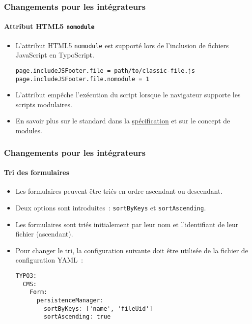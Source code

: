 
\begin{frame}[fragile]
	\frametitle{Changements pour les intégrateurs}
	\framesubtitle{Attribut HTML5 \texttt{nomodule}}

	\lstset{basicstyle=\tiny\ttfamily}

	\begin{itemize}
		\item L'attribut HTML5 \texttt{nomodule} est supporté lors de l'inclusion de fichiers JavaScript en TypoScript.
\begin{lstlisting}
page.includeJSFooter.file = path/to/classic-file.js
page.includeJSFooter.file.nomodule = 1
\end{lstlisting}

		\item L'attribut empêche l'exécution du script lorsque le navigateur supporte les scripts modulaires.

		\item En savoir plus sur le standard dans la
			\href{https://html.spec.whatwg.org/multipage/scripting.html#attr-script-nomodule}{spécification}
			et sur le concept de
			\href{https://hacks.mozilla.org/2015/08/es6-in-depth-modules/}{modules}.

	\end{itemize}


\end{frame}


\begin{frame}[fragile]
	\frametitle{Changements pour les intégrateurs}
	\framesubtitle{Tri des formulaires}

	\lstset{basicstyle=\tiny\ttfamily}

	\begin{itemize}
		\item Les formulaires peuvent être triés en ordre ascendant ou descendant.
		\item Deux options sont introduites~: \texttt{sortByKeys} et \texttt{sortAscending}.
		\item Les formulaires sont triés initialement par leur nom et l'identifiant de leur fichier (ascendant).
		\item Pour changer le tri, la configuration suivante doit être utilisée de la fichier de configuration YAML~:
\begin{lstlisting}
TYPO3:
  CMS:
    Form:
      persistenceManager:
        sortByKeys: ['name', 'fileUid']
        sortAscending: true
\end{lstlisting}

	\end{itemize}

\end{frame}

